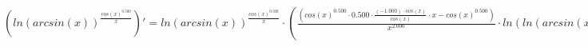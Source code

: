\documentclass[a4paper,12pt]{article}
\begin{document}
\begin{math}
	( ln ( arcsin (x) )  ^{ \frac{ cos (x)  ^{0.500} }{x} } )' =  ln ( arcsin (x) )  ^{ \frac{ cos (x)  ^{0.500} }{x} }  \cdot ( \frac{( cos (x)  ^{0.500}  \cdot 0.500 \cdot  \frac{(-1.000) \cdot  sin (x) }{ cos (x) }  \cdot x -  cos (x)  ^{0.500} )}{x ^{2.000} }  \cdot  ln ( ln ( arcsin (x) ) )  +  \frac{ \frac{1.000}{ arcsin (x) }  \cdot  \frac{1.000}{(1.000 - x ^{2.000} ) ^{0.500} } }{ ln ( arcsin (x) ) }  \cdot  \frac{ cos (x)  ^{0.500} }{x} )\end{math}
\end{document}
